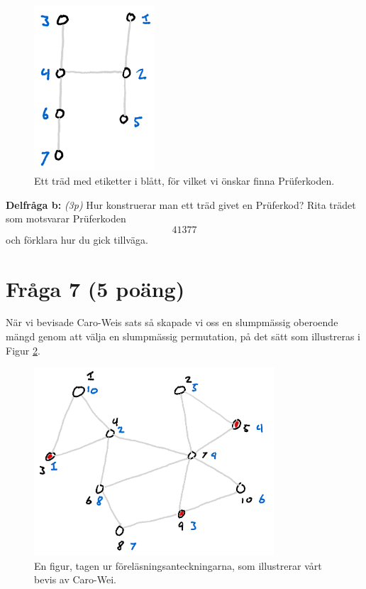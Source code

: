 \documentclass[nobib]{tufte-handout}
\begin{document}
\begin{figure}
  \centering
  \includegraphics[width=0.4\textwidth]{graphics/prufer_code_tree.png}
  \caption{Ett träd med etiketter i blått, för vilket vi önskar finna Prüferkoden.}
  \label{fig:prufer_code_tree}
\end{figure}

\textbf{Delfråga b:} \emph{(3p)} Hur konstruerar man ett träd givet en Prüferkod? Rita trädet som motsvarar Prüferkoden
$$41377$$
och förklara hur du gick tillväga.

\section{Fråga 7 (5 poäng)} %

När vi bevisade Caro-Weis sats så skapade vi oss en slumpmässig oberoende mängd genom att välja en slumpmässig permutation, på det sätt som illustreras i Figur \ref{fig:caro_wei}.

\begin{figure}
  \centering
  \includegraphics[width=0.8\textwidth]{graphics/Caro_Wei_construction.png}
  \caption{En figur, tagen ur föreläsningsanteckningarna, som illustrerar vårt bevis av Caro-Wei.}
  \label{fig:caro_wei}
\end{figure}
\end{document}
